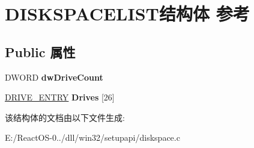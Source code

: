 \hypertarget{struct_d_i_s_k_s_p_a_c_e_l_i_s_t}{}\section{D\+I\+S\+K\+S\+P\+A\+C\+E\+L\+I\+S\+T结构体 参考}
\label{struct_d_i_s_k_s_p_a_c_e_l_i_s_t}
\subsection*{Public 属性}
\begin{DoxyCompactItemize}
\item 
\mbox{\label{struct_d_i_s_k_s_p_a_c_e_l_i_s_t_a7c4023c3470ff2c592f40d71803f7eef}} 
D\+W\+O\+RD {\bfseries dw\+Drive\+Count}
\item 
\mbox{\label{struct_d_i_s_k_s_p_a_c_e_l_i_s_t_a7fbf7e4ee3ce7f0aa3018f3b04fc7ba1}} 
\hyperlink{struct_d_r_i_v_e___e_n_t_r_y}{D\+R\+I\+V\+E\+\_\+\+E\+N\+T\+RY} {\bfseries Drives} \mbox{[}26\mbox{]}
\end{DoxyCompactItemize}


该结构体的文档由以下文件生成\+:\begin{DoxyCompactItemize}
\item 
E\+:/\+React\+O\+S-\/0../dll/win32/setupapi/diskspace.\+c\end{DoxyCompactItemize}
